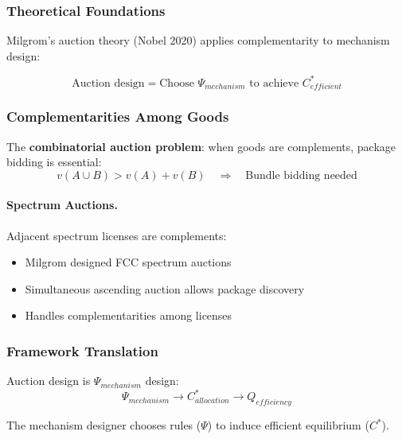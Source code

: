 \subsubsection{Theoretical Foundations}

Milgrom's auction theory (Nobel 2020) applies complementarity to mechanism design:

\begin{equation}
\boxed{
\text{Auction design} = \text{Choose } \Psi_{mechanism} \text{ to achieve } C^*_{efficient}
}
\label{eq:mr-auction}
\end{equation}

\subsubsection{Complementarities Among Goods}

The \textbf{combinatorial auction problem}: when goods are complements, 
package bidding is essential:
\begin{equation}
v(A \cup B) > v(A) + v(B) \quad \Rightarrow \quad \text{Bundle bidding needed}
\end{equation}

\paragraph{Spectrum Auctions.}
Adjacent spectrum licenses are complements:
\begin{itemize}
    \item Milgrom designed FCC spectrum auctions
    \item Simultaneous ascending auction allows package discovery
    \item Handles complementarities among licenses
\end{itemize}

\subsubsection{Framework Translation}

Auction design is $\Psi_{mechanism}$ design:
\begin{equation}
\Psi_{mechanism} \to C^*_{allocation} \to Q_{efficiency}
\end{equation}

The mechanism designer chooses rules ($\Psi$) to induce efficient equilibrium ($C^*$).

